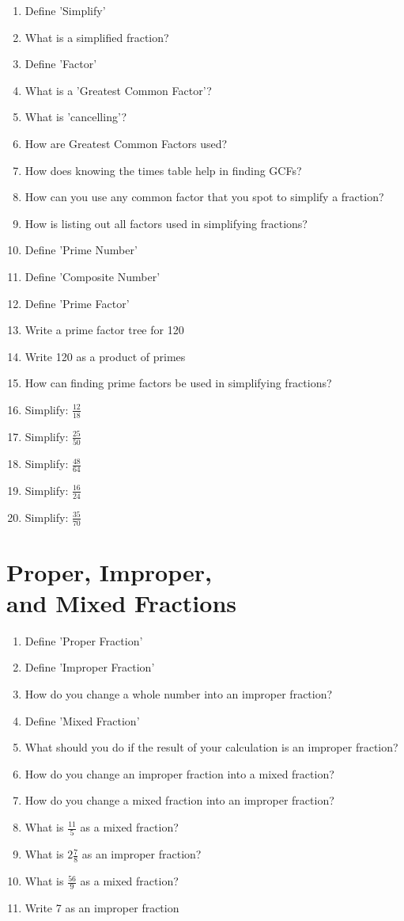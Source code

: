 \documentclass{article}
\begin{document}
\begin{enumerate}
    \item Define 'Simplify'
    \item What is a simplified fraction?
    \item Define 'Factor'
    \item What is a 'Greatest Common Factor'?
    \item What is 'cancelling'?
    \item How are Greatest Common Factors used?
    \item How does knowing the times table help in finding GCFs?
    \item How can you use any common factor that you spot to simplify a fraction?
    \item How is listing out all factors used in simplifying fractions?
    \item Define 'Prime Number'
    \item Define 'Composite Number'
    \item Define 'Prime Factor'
    \item Write a prime factor tree for 120
    \item Write 120 as a product of primes
    \item How can finding prime factors be used in simplifying fractions?

    \item Simplify: $\frac{12}{18}$
    \item Simplify: $\frac{25}{50}$
    \item Simplify: $\frac{48}{64}$
    \item Simplify: $\frac{16}{24}$
    \item Simplify: $\frac{35}{70}$
\end{enumerate}

\section*{Proper, Improper,\\and Mixed Fractions}

\begin{enumerate}
    \item Define 'Proper Fraction'
    \item Define 'Improper Fraction'
    \item How do you change a whole number into an improper fraction?
    \item Define 'Mixed Fraction'
    \item What should you do if the result of your calculation is an improper fraction?
    \item How do you change an improper fraction into a mixed fraction?
    \item How do you change a mixed fraction into an improper fraction?
    \item What is $\frac{11}{5}$ as a mixed fraction?
    \item What is $2 \frac{7}{8}$ as an improper fraction?
    \item What is $\frac{56}{9}$ as a mixed fraction?
    \item Write 7 as an improper fraction
\end{enumerate}
\end{document}
